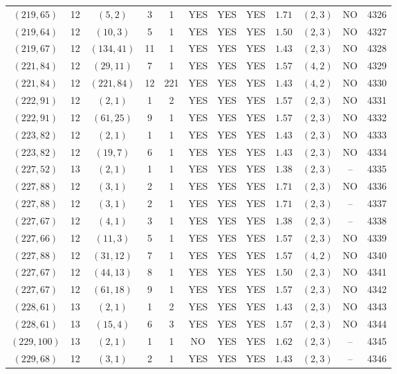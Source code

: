 \begin{longtable}{|c|c|c|c|c|c|c|c|c|c|c|c|}
$(219,65)$ & 12 & $(5,2)$ & 3 & 1 & YES & YES & YES & $1.71$ & $(2,3)$ & NO & 4326\\
$(219,64)$ & 12 & $(10,3)$ & 5 & 1 & YES & YES & YES & $1.50$ & $(2,3)$ & NO & 4327\\
$(219,67)$ & 12 & $(134,41)$ & 11 & 1 & YES & YES & YES & $1.43$ & $(2,3)$ & NO & 4328\\
$(221,84)$ & 12 & $(29,11)$ & 7 & 1 & YES & YES & YES & $1.57$ & $(4,2)$ & NO & 4329\\
$(221,84)$ & 12 & $(221,84)$ & 12 & 221 & YES & YES & YES & $1.43$ & $(4,2)$ & NO & 4330\\
$(222,91)$ & 12 & $(2,1)$ & 1 & 2 & YES & YES & YES & $1.57$ & $(2,3)$ & NO & 4331\\
$(222,91)$ & 12 & $(61,25)$ & 9 & 1 & YES & YES & YES & $1.57$ & $(2,3)$ & NO & 4332\\
$(223,82)$ & 12 & $(2,1)$ & 1 & 1 & YES & YES & YES & $1.43$ & $(2,3)$ & NO & 4333\\
$(223,82)$ & 12 & $(19,7)$ & 6 & 1 & YES & YES & YES & $1.43$ & $(2,3)$ & NO & 4334\\
$(227,52)$ & 13 & $(2,1)$ & 1 & 1 & YES & YES & YES & $1.38$ & $(2,3)$ & -- & 4335\\
$(227,88)$ & 12 & $(3,1)$ & 2 & 1 & YES & YES & YES & $1.71$ & $(2,3)$ & NO & 4336\\
$(227,88)$ & 12 & $(3,1)$ & 2 & 1 & YES & YES & YES & $1.71$ & $(2,3)$ & -- & 4337\\
$(227,67)$ & 12 & $(4,1)$ & 3 & 1 & YES & YES & YES & $1.38$ & $(2,3)$ & -- & 4338\\
$(227,66)$ & 12 & $(11,3)$ & 5 & 1 & YES & YES & YES & $1.57$ & $(2,3)$ & NO & 4339\\
$(227,88)$ & 12 & $(31,12)$ & 7 & 1 & YES & YES & YES & $1.57$ & $(4,2)$ & NO & 4340\\
$(227,67)$ & 12 & $(44,13)$ & 8 & 1 & YES & YES & YES & $1.50$ & $(2,3)$ & NO & 4341\\
$(227,67)$ & 12 & $(61,18)$ & 9 & 1 & YES & YES & YES & $1.57$ & $(2,3)$ & NO & 4342\\
$(228,61)$ & 13 & $(2,1)$ & 1 & 2 & YES & YES & YES & $1.43$ & $(2,3)$ & NO & 4343\\
$(228,61)$ & 13 & $(15,4)$ & 6 & 3 & YES & YES & YES & $1.57$ & $(2,3)$ & NO & 4344\\
$(229,100)$ & 13 & $(2,1)$ & 1 & 1 & NO & YES & YES & $1.62$ & $(2,3)$ & -- & 4345\\
$(229,68)$ & 12 & $(3,1)$ & 2 & 1 & YES & YES & YES & $1.43$ & $(2,3)$ & -- & 4346\\

\end{longtable}
